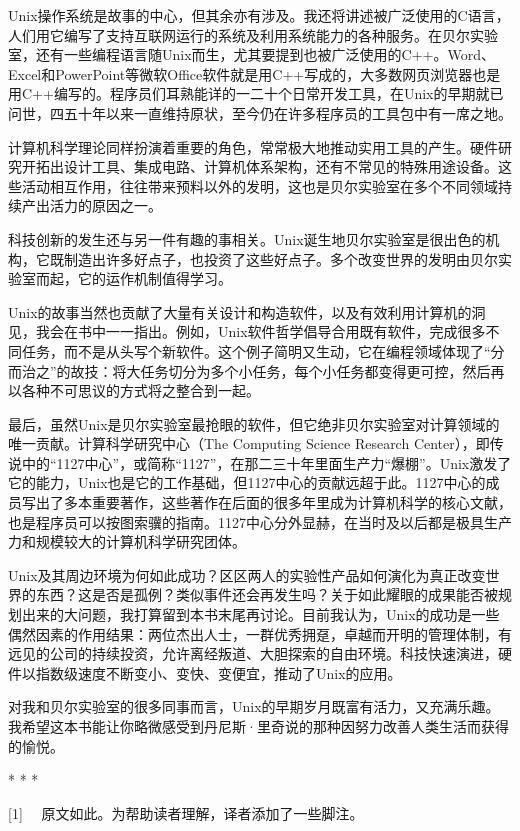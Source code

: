 \documentclass[a4paper,12pt,UTF8,twoside]{ctexbook}
\begin{document}
Unix操作系统是故事的中心，但其余亦有涉及。我还将讲述被广泛使用的C语言，人们用它编写了支持互联网运行的系统及利用系统能力的各种服务。在贝尔实验室，还有一些编程语言随Unix而生，尤其要提到也被广泛使用的C++。Word、Excel和PowerPoint等微软Office软件就是用C++写成的，大多数网页浏览器也是用C++编写的。程序员们耳熟能详的一二十个日常开发工具，在Unix的早期就已问世，四五十年以来一直维持原状，至今仍在许多程序员的工具包中有一席之地。

计算机科学理论同样扮演着重要的角色，常常极大地推动实用工具的产生。硬件研究开拓出设计工具、集成电路、计算机体系架构，还有不常见的特殊用途设备。这些活动相互作用，往往带来预料以外的发明，这也是贝尔实验室在多个不同领域持续产出活力的原因之一。

科技创新的发生还与另一件有趣的事相关。Unix诞生地贝尔实验室是很出色的机构，它既制造出许多好点子，也投资了这些好点子。多个改变世界的发明由贝尔实验室而起，它的运作机制值得学习。

Unix的故事当然也贡献了大量有关设计和构造软件，以及有效利用计算机的洞见，我会在书中一一指出。例如，Unix软件哲学倡导合用既有软件，完成很多不同任务，而不是从头写个新软件。这个例子简明又生动，它在编程领域体现了“分而治之”的故技：将大任务切分为多个小任务，每个小任务都变得更可控，然后再以各种不可思议的方式将之整合到一起。

最后，虽然Unix是贝尔实验室最抢眼的软件，但它绝非贝尔实验室对计算领域的唯一贡献。计算科学研究中心（The Computing Science Research Center），即传说中的“1127中心”，或简称“1127”，在那二三十年里面生产力“爆棚”。Unix激发了它的能力，Unix也是它的工作基础，但1127中心的贡献远超于此。1127中心的成员写出了多本重要著作，这些著作在后面的很多年里成为计算机科学的核心文献，也是程序员可以按图索骥的指南。1127中心分外显赫，在当时及以后都是极具生产力和规模较大的计算机科学研究团体。

Unix及其周边环境为何如此成功？区区两人的实验性产品如何演化为真正改变世界的东西？这是否是孤例？类似事件还会再发生吗？关于如此耀眼的成果能否被规划出来的大问题，我打算留到本书末尾再讨论。目前我认为，Unix的成功是一些偶然因素的作用结果：两位杰出人士，一群优秀拥趸，卓越而开明的管理体制，有远见的公司的持续投资，允许离经叛道、大胆探索的自由环境。科技快速演进，硬件以指数级速度不断变小、变快、变便宜，推动了Unix的应用。

对我和贝尔实验室的很多同事而言，Unix的早期岁月既富有活力，又充满乐趣。我希望这本书能让你略微感受到丹尼斯·里奇说的那种因努力改善人类生活而获得的愉悦。



* * *



[1] 　原文如此。为帮助读者理解，译者添加了一些脚注。
\end{document}
